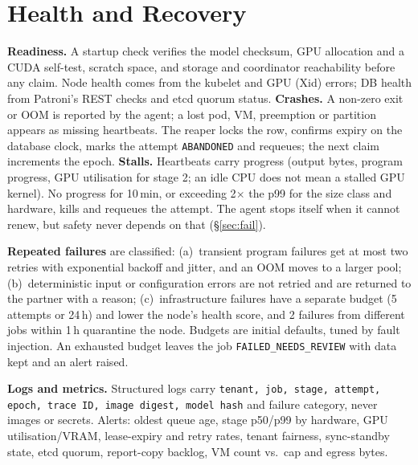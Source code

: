 \documentclass[10pt,a4paper]{article}
\begin{document}
\section{Health and Recovery}
\textbf{Readiness.} A startup check verifies the model checksum, GPU allocation and a CUDA self-test,
scratch space, and storage and coordinator reachability before any claim. Node health comes from the
kubelet and GPU (Xid) errors; DB health from Patroni's REST checks and etcd quorum status.
\textbf{Crashes.} A non-zero exit or OOM is reported by the agent; a lost pod, VM, preemption or partition
appears as missing heartbeats. The reaper locks the row, confirms expiry on the database clock, marks the
attempt \texttt{ABANDONED} and requeues; the next claim increments the epoch.
\textbf{Stalls.} Heartbeats carry progress (output bytes, program progress, GPU utilisation for stage 2;
an idle CPU does not mean a stalled GPU kernel). No progress for 10\,min, or exceeding 2$\times$ the p99
for the size class and hardware, kills and requeues the attempt. The agent stops itself when it cannot
renew, but safety never depends on that (\S\ref{sec:fail}).

\textbf{Repeated failures} are classified: (a)~transient program failures get at most two retries with
exponential backoff and jitter, and an OOM moves to a larger pool; (b)~deterministic input or
configuration errors are not retried and are returned to the partner with a reason; (c)~infrastructure
failures have a separate budget (5 attempts or 24\,h) and lower the node's health score, and 2 failures
from different jobs within 1\,h quarantine the node. Budgets are initial defaults, tuned by fault injection.
An exhausted budget leaves the job \texttt{FAILED\_NEEDS\_REVIEW} with data kept and an alert raised.

\textbf{Logs and metrics.} Structured logs carry \texttt{tenant, job, stage, attempt, epoch, trace ID, image
digest, model hash} and failure category, never images or secrets. Alerts: oldest queue age, stage p50/p99
by hardware, GPU utilisation/VRAM, lease-expiry and retry rates, tenant fairness, sync-standby state,
etcd quorum, report-copy backlog, VM count vs.\ cap and egress bytes.

\end{document}
